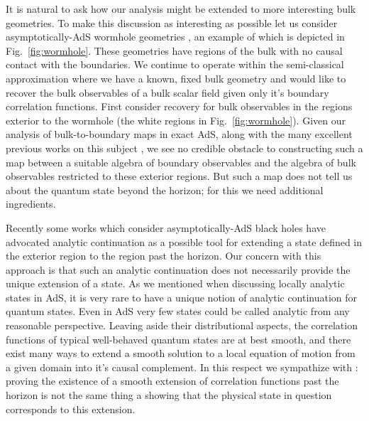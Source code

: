 \documentclass[12pt,a4paper]{article}
\numberwithin{equation}{section}
\begin{document}
It is natural to ask how our analysis might be extended to more 
interesting bulk geometries. To make this discussion as interesting as
possible let us consider asymptotically-AdS wormhole geometries
\cite{Aminneborg:1997aa,Krasnov:2000zq,Krasnov:2003aa,Skenderis:2009ju,
  Shenker:2013yza},
an example of which is depicted in Fig.~\ref{fig:wormhole}.
These geometries have regions of the bulk with no causal contact
with the boundaries.
We continue to operate within the semi-classical approximation
where we have a known, fixed bulk geometry and would like to
recover the bulk observables of a bulk scalar field given only
it's boundary correlation functions.
First consider recovery for bulk observables in the regions exterior
to the wormhole (the white regions in Fig.~\ref{fig:wormhole}).
Given our analysis of bulk-to-boundary maps in exact AdS, along with
the many excellent previous works on this subject
\cite{Bena:1999jv,Hamilton:2005ju,Hamilton:2006az,Hamilton:2006fh,
  Lowe:2008ra,Kabat:2011rz,Heemskerk:2012mq,Kabat:2012hp,Kabat:2012av},
we see no credible obstacle to constructing such a map between
a suitable algebra of boundary observables and the algebra of 
bulk observables restricted to these exterior regions.
But such a map does not tell us about the quantum state beyond 
the horizon; for this we need additional ingredients.


Recently some works \cite{Papadodimas:2012aq,Verlinde:2013qya}
which consider asymptotically-AdS black holes
have advocated analytic continuation as a possible tool for 
extending a state defined in the exterior
region to the region past the horizon.
Our concern with this approach is that such an analytic continuation
does not necessarily provide the unique extension of a state.
As we mentioned when discussing locally analytic states in AdS,
it is very rare to have a unique notion of analytic continuation for
quantum states.
Even in AdS very few states could be 
called analytic from any reasonable perspective. Leaving aside 
their distributional aspects, the correlation functions
of typical well-behaved quantum states are at best smooth,
and there exist many ways to extend a smooth solution to a local
equation of motion from a given domain into it's causal complement.
In this respect we sympathize with \cite{Avery:2013bea}:
proving the existence of a smooth extension of correlation functions
past the horizon is not the same thing a showing that
the physical state in question corresponds to this extension.
\end{document}

